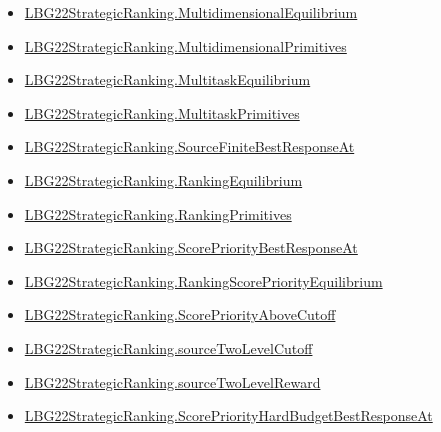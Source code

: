 \documentclass[10pt]{article}
\begin{document}
\begin{itemize}[leftmargin=1.2em]
\begin{itemize}[leftmargin=1.2em]
\item \hyperlink{paper-prerequisite-b201854e4e4dd891}{LBG22\allowbreak{}Strategic\allowbreak{}Ranking.\allowbreak{}Multidimensional\allowbreak{}Equilibrium}
\item \hyperlink{paper-prerequisite-8e74a377842bef95}{LBG22\allowbreak{}Strategic\allowbreak{}Ranking.\allowbreak{}Multidimensional\allowbreak{}Primitives}
\item \hyperlink{paper-prerequisite-b504d72e1e0de867}{LBG22\allowbreak{}Strategic\allowbreak{}Ranking.\allowbreak{}Multitask\allowbreak{}Equilibrium}
\item \hyperlink{paper-prerequisite-3c93745e73ce0a63}{LBG22\allowbreak{}Strategic\allowbreak{}Ranking.\allowbreak{}Multitask\allowbreak{}Primitives}
\item \hyperlink{paper-prerequisite-519e321cd0957049}{LBG22\allowbreak{}Strategic\allowbreak{}Ranking.\allowbreak{}Source\allowbreak{}Finite\allowbreak{}Best\allowbreak{}Response\allowbreak{}At}
\item \hyperlink{paper-prerequisite-2a1b692f4e3136c6}{LBG22\allowbreak{}Strategic\allowbreak{}Ranking.\allowbreak{}Ranking\allowbreak{}Equilibrium}
\item \hyperlink{paper-prerequisite-9bbcc12f4a1736bf}{LBG22\allowbreak{}Strategic\allowbreak{}Ranking.\allowbreak{}Ranking\allowbreak{}Primitives}
\item \hyperlink{paper-prerequisite-2dc31b75c00d0d1b}{LBG22\allowbreak{}Strategic\allowbreak{}Ranking.\allowbreak{}Score\allowbreak{}Priority\allowbreak{}Best\allowbreak{}Response\allowbreak{}At}
\item \hyperlink{paper-prerequisite-f396601c268691e5}{LBG22\allowbreak{}Strategic\allowbreak{}Ranking.\allowbreak{}Ranking\allowbreak{}Score\allowbreak{}Priority\allowbreak{}Equilibrium}
\item \hyperlink{paper-prerequisite-38434fa78df931b7}{LBG22\allowbreak{}Strategic\allowbreak{}Ranking.\allowbreak{}Score\allowbreak{}Priority\allowbreak{}Above\allowbreak{}Cutoff}
\item \hyperlink{paper-prerequisite-f88aac58507e44ca}{LBG22\allowbreak{}Strategic\allowbreak{}Ranking.\allowbreak{}source\allowbreak{}Two\allowbreak{}Level\allowbreak{}Cutoff}
\item \hyperlink{paper-prerequisite-30d97cd43eb79017}{LBG22\allowbreak{}Strategic\allowbreak{}Ranking.\allowbreak{}source\allowbreak{}Two\allowbreak{}Level\allowbreak{}Reward}
\item \hyperlink{paper-prerequisite-c64406972a4c963f}{LBG22\allowbreak{}Strategic\allowbreak{}Ranking.\allowbreak{}Score\allowbreak{}Priority\allowbreak{}Hard\allowbreak{}Budget\allowbreak{}Best\allowbreak{}Response\allowbreak{}At}

\end{itemize}
\end{itemize}
\end{document}
